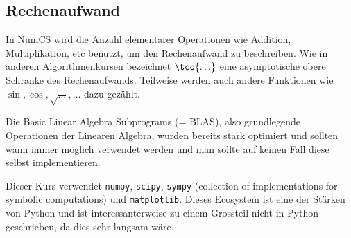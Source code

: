 
\newsectionNoPB
\subsection{Rechenaufwand}
In NumCS wird die Anzahl elementarer Operationen wie Addition, Multiplikation, etc benutzt, um den Rechenaufwand zu beschreiben. 
Wie in anderen Algorithmenkursen bezeichnet $\tco{\ldots}$ eine asymptotische obere Schranke des Rechenaufwands.
Teilweise werden auch andere Funktionen wie $\sin, \cos, \sqrt{\ldots}, \ldots$ dazu gezählt.

Die Basic Linear Algebra Subprograms (= BLAS), also grundlegende Operationen der Linearen Algebra, wurden bereits stark optimiert und sollten wann immer möglich verwendet werden und man sollte auf keinen Fall diese selbst implementieren.

Dieser Kurs verwendet \texttt{numpy}, \texttt{scipy}, \texttt{sympy} (collection of implementations for symbolic computations) und \texttt{matplotlib}.
Dieses Ecosystem ist eine der Stärken von Python und ist interessanterweise zu einem Grossteil nicht in Python geschrieben, da dies sehr langsam wäre.
